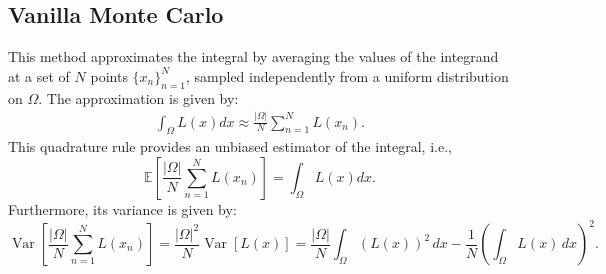 \documentclass{article}
\theoremstyle{definition}
\begin{document}
\subsection{Vanilla Monte Carlo}
This method approximates the integral by averaging the values of the integrand at a set of $N$ points $\{x_n\}_{n=1}^{N}$, sampled independently from a uniform distribution on $\Omega$. The approximation is given by:
\begin{align*}
    \int_{\Omega} L(x)dx \approx \frac{|\Omega|}{N}\sum_{n=1}^{N} L(x_n).
\end{align*}
This quadrature rule provides an unbiased estimator of the integral, i.e., $$\mathbb{E}\left [\frac{|\Omega|}{N}\sum_{n=1}^{N} L(x_n)\right] = \int_{\Omega} L(x)dx.$$ Furthermore, its variance is given by:
\begin{equation}
    \operatorname{Var}\left [ \frac{|\Omega|}{N}\sum_{n=1}^{N} L(x_n)\right] = \frac{|\Omega|^2}{N} \operatorname{Var}[L(x)] =\frac{|\Omega|}{N} \int_{\Omega} (L(x))^2 \, dx - \frac{1}{N} \left( \int_{\Omega} L(x) \, dx \right)^2.
\end{equation}
\end{document}
